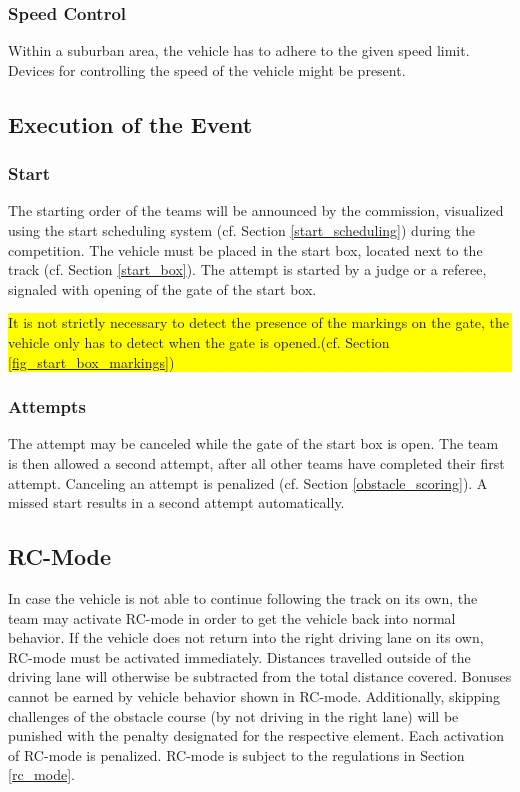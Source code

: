 \documentclass[a4paper]{report}
\newlength\colorboxwidth
\begin{document}
{{\subsubsection{Speed Control}

Within a suburban area, the vehicle has to adhere to the given speed limit. Devices for controlling the speed of the vehicle might be present. 

\subsection{Execution of the Event}

\subsubsection{Start}

The starting order of the teams will be announced by the commission, visualized using the start scheduling system (cf. Section \ref{start_scheduling}) during the competition. The vehicle must be placed in the start box, located next to the track (cf. Section \ref{start_box}). The attempt is started by a judge or a referee, signaled with opening of the gate of the start box.\\
{\colorbox{yellow}{\parbox{\colorboxwidth}{It is not strictly necessary to detect the presence of the markings on the gate, the vehicle only has to detect when the gate is opened.(cf. Section \ref{fig_start_box_markings})}}


\subsubsection{Attempts}

The attempt may be canceled while the gate of the start box is open. The team is then allowed a second attempt, after all other teams have completed their first attempt. Canceling an attempt is penalized (cf. Section \ref{obstacle_scoring}). A missed start results in a second attempt automatically. 

\subsection{RC-Mode}

In case the vehicle is not able to continue following the track on its own, the team may activate RC-mode in order to get the vehicle back into normal behavior. If the vehicle does not return into the right driving lane on its own, RC-mode must be activated immediately. Distances travelled outside of the driving lane will otherwise be subtracted from the total distance covered. Bonuses cannot be earned by vehicle behavior shown in RC-mode. Additionally, skipping challenges of the obstacle course (by not driving in the right lane) will be punished with the penalty designated for the respective element. Each activation of RC-mode is penalized. RC-mode is subject to the regulations in Section \ref{rc_mode}. 

}}}
\end{document}
